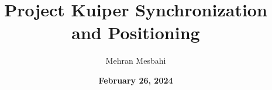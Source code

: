 \documentclass[11pt]{book}
\begin{document}
\title{{\bf \large Project Kuiper Synchronization and Positioning}}
\author{\large Mehran Mesbahi}
\date{\color{blue} \bf February 26, 2024}



	
\end{document}

